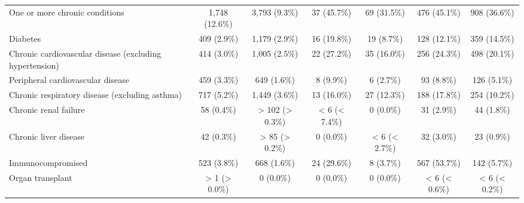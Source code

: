 \documentclass{article}
\begin{document}
\begin{table}[htbp]
\begin{longtable}{l*{6}{c}}
One or more chronic conditions                          &          1,748 (12.6\%)         &          3,793 (9.3\%)          &           37 (45.7\%)           &           69 (31.5\%)           &           476 (45.1\%)          &           908 (36.6\%)          \\
Diabetes                                                &           409 (2.9\%)           &          1,179 (2.9\%)          &           16 (19.8\%)           &            19 (8.7\%)           &           128 (12.1\%)          &           359 (14.5\%)          \\
Chronic cardiovascular disease (excluding hypertension) &           414 (3.0\%)           &          1,005 (2.5\%)          &           22 (27.2\%)           &           35 (16.0\%)           &           256 (24.3\%)          &           498 (20.1\%)          \\
Peripheral cardiovascular disease                       &           459 (3.3\%)           &           649 (1.6\%)           &            8 (9.9\%)            &            6 (2.7\%)            &            93 (8.8\%)           &           126 (5.1\%)           \\
Chronic respiratory disease (excluding asthma)          &           717 (5.2\%)           &          1,449 (3.6\%)          &           13 (16.0\%)           &           27 (12.3\%)           &           188 (17.8\%)          &           254 (10.2\%)          \\
Chronic renal failure                                   &            58 (0.4\%)           &         > 102 (> 0.3\%)         &          < 6 (< 7.4\%)          &            0 (0.0\%)            &            31 (2.9\%)           &            44 (1.8\%)           \\
Chronic liver disease                                   &            42 (0.3\%)           &          > 85 (> 0.2\%)         &            0 (0.0\%)            &          < 6 (< 2.7\%)          &            32 (3.0\%)           &            23 (0.9\%)           \\
Immunocompromised                                       &           523 (3.8\%)           &           668 (1.6\%)           &           24 (29.6\%)           &            8 (3.7\%)            &           567 (53.7\%)          &           142 (5.7\%)           \\
Organ transplant                                        &          > 1 (> 0.0\%)          &            0 (0.0\%)            &            0 (0.0\%)            &            0 (0.0\%)            &          < 6 (< 0.6\%)          &          < 6 (< 0.2\%)          \\

\end{longtable}
\end{table}
\end{document}
